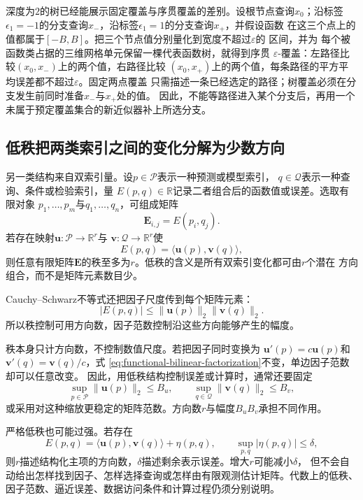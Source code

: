 深度为$2$的树已经能展示固定覆盖与序贯覆盖的差别。设根节点查询$x_0$；沿标签
$\epsilon_1=-1$的分支查询$x_-$，沿标签$\epsilon_1=1$的分支查询$x_+$，并假设函数
在这三个点上的值都属于$[-B,B]$。把三个节点值分别量化到宽度不超过$\varepsilon$的
区间，并为
每个被函数类占据的三维网格单元保留一棵代表函数树，就得到序贯
$\varepsilon$-覆盖：左路径比较$(x_0,x_-)$上的两个值，右路径比较
$(x_0,x_+)$上的两个值，每条路径的平方平均误差都不超过$\varepsilon$。固定两点覆盖
只需描述一条已经选定的路径；树覆盖必须在分支发生前同时准备$x_-$与$x_+$处的值。
因此，不能等路径进入某个分支后，再用一个未属于预定覆盖集合的新近似器补上所选分支。

\subsection{低秩把两类索引之间的变化分解为少数方向}

另一类结构来自双索引量。设$p\in\mathcal{P}$表示一种预测或模型索引，
$q\in\mathcal{Q}$表示一种查询、条件或检验索引，量
$E(p,q)\in\mathbb{R}$记录二者组合后的函数值或误差。选取有限对象
$p_1,\ldots,p_m$与$q_1,\ldots,q_n$，可组成矩阵
\[
  \bm{E}_{i,j}=E(p_i,q_j).
\]
若存在映射$\bm{u}:\mathcal{P}\to\mathbb{R}^r$与
$\bm{v}:\mathcal{Q}\to\mathbb{R}^r$使
\begin{equation}
  E(p,q)
  =
  \langle\bm{u}(p),\bm{v}(q)\rangle,
  \label{eq:functional-bilinear-factorization}
\end{equation}
则任意有限矩阵$\bm{E}$的秩至多为$r$。低秩的含义是所有双索引变化都可由$r$个潜在
方向组合，而不是矩阵元素数目少。

Cauchy--Schwarz不等式还把因子尺度传到每个矩阵元素：
\[
  |E(p,q)|
  \leq
  \lVert\bm{u}(p)\rVert_2
  \lVert\bm{v}(q)\rVert_2.
\]
所以秩控制可用方向数，因子范数控制沿这些方向能够产生的幅度。

秩本身只计方向数，不控制数值尺度。若把因子同时变换为
$\bm{u}'(p)=c\bm{u}(p)$和
$\bm{v}'(q)=\bm{v}(q)/c$，式
\eqref{eq:functional-bilinear-factorization}不变，单边因子范数却可以任意改变。
因此，用低秩结构控制误差或计算时，通常还要固定
\[
  \sup_{p\in\mathcal{P}}\lVert\bm{u}(p)\rVert_2\leq B_u,
  \qquad
  \sup_{q\in\mathcal{Q}}\lVert\bm{v}(q)\rVert_2\leq B_v,
\]
或采用对这种缩放更稳定的矩阵范数。方向数$r$与幅度$B_uB_v$承担不同作用。

严格低秩也可能过强。若存在
\[
  E(p,q)
  =
  \langle\bm{u}(p),\bm{v}(q)\rangle+\eta(p,q),
  \qquad
  \sup_{p,q}|\eta(p,q)|\leq\delta,
\]
则$r$描述结构化主项的方向数，$\delta$描述剩余表示误差。增大$r$可能减小$\delta$，
但不会自动给出怎样找到因子、怎样选择查询或怎样由有限观测估计矩阵。代数上的低秩、
因子范数、逼近误差、数据访问条件和计算过程仍须分别说明。

